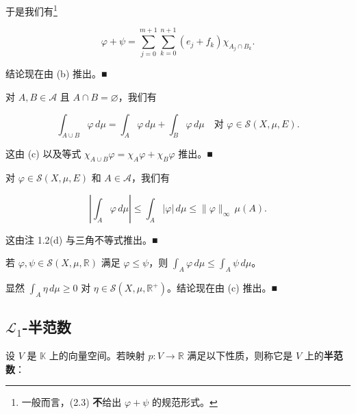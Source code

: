\begin{remark}
\begin{items}
于是我们有\footnote{一般而言，(2.3) \textbf{不}给出 $ \varphi + \psi $ 的规范形式。}

\begin{equation}
\varphi + \psi = \sum_{j=0}^{m+1} \sum_{k=0}^{n+1} (e_j + f_k) \chi_{A_j \cap B_k} .\tag{2.3}
\end{equation}

结论现在由 (b) 推出。\nobreak\hspace{0.35em}■

\item[（d）]

对 $ A, B \in \mathcal{A} $ 且 $ A \cap B = \varnothing $，我们有

\[
\int_{A \cup B} \varphi \, d\mu = \int_A \varphi \, d\mu + \int_B \varphi \, d\mu \quad \text{对 } \varphi \in \mathcal{S}(X,\mu,E) .
\]

\proofhead
这由 (c) 以及等式 $ \chi_{A \cup B} \varphi = \chi_A \varphi + \chi_B \varphi $ 推出。\nobreak\hspace{0.35em}■
\item[（e）]

对 $ \varphi \in \mathcal{S}(X,\mu,E) $ 和 $ A \in \mathcal{A} $，我们有

\[
\left| \int_A \varphi \, d\mu \right| \le \int_A |\varphi| \, d\mu \le \|\varphi\|_\infty \, \mu(A) .
\]

\proofhead
这由注 1.2(d) 与三角不等式推出。\nobreak\hspace{0.35em}■
\item[（f）]

若 $ \varphi, \psi \in \mathcal{S}(X,\mu,\mathbb{R}) $ 满足 $ \varphi \le \psi $，则 $ \int_A \varphi \, d\mu \le \int_A \psi \, d\mu $。

\proofhead
显然 $ \int_A \eta \, d\mu \ge 0 $ 对 $ \eta \in \mathcal{S}(X,\mu,\mathbb{R}^{+}) $。结论现在由 (c) 推出。\nobreak\hspace{0.35em}■
\end{items}

\end{remark}

\subsection*{$ \mathcal{L}_1 $-半范数}

设 $ V $ 是 $ \mathbb{K} $ 上的向量空间。若映射 $ p : V \to \mathbb{R} $ 满足以下性质，则称它是 $ V $ 上的\textbf{半范数}：

